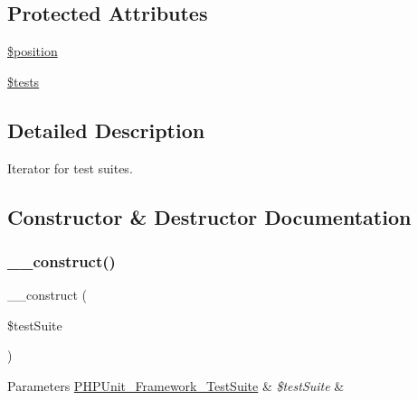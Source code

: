 \subsection*{Protected Attributes}
\begin{DoxyCompactItemize}
\item 
\mbox{\hyperlink{class_p_h_p_unit___util___test_suite_iterator_a6e88dcb746884d18f6c89eb9b9c14a42}{\$position}}
\item 
\mbox{\hyperlink{class_p_h_p_unit___util___test_suite_iterator_a6d7f4b753e7eb18b328a7eeba5e0094f}{\$tests}}
\end{DoxyCompactItemize}


\subsection{Detailed Description}
Iterator for test suites. 

\subsection{Constructor \& Destructor Documentation}
\mbox{\label{class_p_h_p_unit___util___test_suite_iterator_a7de4dbf7987ce90f37e15a0a620b205d}} 
\subsubsection{\texorpdfstring{\+\_\+\+\_\+construct()}{\_\_construct()}}
{\footnotesize\ttfamily \+\_\+\+\_\+construct (\begin{DoxyParamCaption}\item[{\mbox{\hyperlink{class_p_h_p_unit___framework___test_suite}{P\+H\+P\+Unit\+\_\+\+Framework\+\_\+\+Test\+Suite}}}]{\$test\+Suite }\end{DoxyParamCaption})}


\begin{DoxyParams}[1]{Parameters}
\mbox{\hyperlink{class_p_h_p_unit___framework___test_suite}{P\+H\+P\+Unit\+\_\+\+Framework\+\_\+\+Test\+Suite}} & {\em \$test\+Suite} & \\
\hline
\end{DoxyParams}


